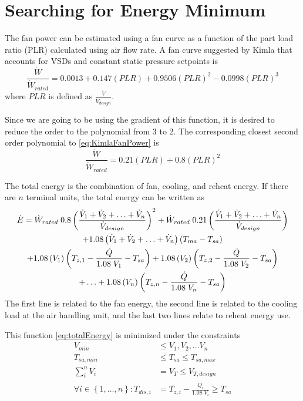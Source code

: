 \section{Searching for Energy Minimum}

The fan power can be estimated using a fan curve as a function of the part load ratio (PLR) calculated using air flow rate. A fan curve suggested by Kimla that accounts for VSDs and constant static pressure setpoints is
\begin{equation}\label{eq:KimlaFanPower}
\frac{\dot{W}}{\dot{W}_{rated}} = 0.0013+0.147\left(PLR \right)+0.9506\left(PLR \right)^2-0.0998\left(PLR \right)^3
\end{equation}
where \(PLR\) is defined as \(\frac{\dot{V}}{\dot{V}_{design}}\).

Since we are going to be using the gradient of this function, it is desired to reduce the order to the polynomial from 3 to 2. The corresponding closest second order polynomial to \ref{eq:KimlaFanPower} is
\begin{equation}\label{eq:finalFanPower}
\frac{\dot{W}}{\dot{W}_{rated}} = 0.21\left(PLR \right)+0.8\left(PLR \right)^2
\end{equation}

The total energy is the combination of fan, cooling, and reheat energy. If there are \(n\) terminal units, the total energy can be written as
\begin{multline}\label{eq:totalEnergy}
\dot{E}=\dot{W}_{rated}\;0.8 \left(\frac{\dot{V}_{1}+\dot{V}_{2}+\ldots+\dot{V}_{n}}{\dot{V}_{design}} \right)^2 + \dot{W}_{rated}\;0.21 \left(\frac{\dot{V}_{1}+\dot{V}_{2}+\ldots+\dot{V}_{n}}{\dot{V}_{design}} \right)\\
+1.08\left(\dot{V}_{1}+\dot{V}_{2}+\ldots+\dot{V}_{n} \right)\left(T_{ma}-T_{sa} \right)\\
+1.08\left(V_1 \right)\left(T_{z,1}-\frac{\dot{Q}}{1.08\; V_1} -T_{sa}\right) +1.08\left(V_2 \right)\left(T_{z,2}-\frac{\dot{Q}}{1.08\; V_2} -T_{sa}\right)\\ 
+\ldots+1.08\left(V_n \right)\left(T_{z,n}-\frac{\dot{Q}}{1.08\; V_n} -T_{sa}\right) 
\end{multline}
The first line is related to the fan energy, the second line is related to the cooling load at the air handling unit, and the last two lines relate to reheat energy use. 

This function \ref{eq:totalEnergy} is minimized under the constraints
\begin{align}
V_{min}&\leq V_1, V_2, \ldots V_n \\
T_{sa,min}&\leq T_{sa} \leq T_{sa,max} \\
\sum_i^n V_i &= V_T \leq V_{T,design} \\
\forall i\in\left\{1,\ldots,n\right\}: T_{dis,i} &= T_{z,i} - \frac{\dot{Q}_i}{1.08\;V_i} \geq T_{sa}
\end{align}

